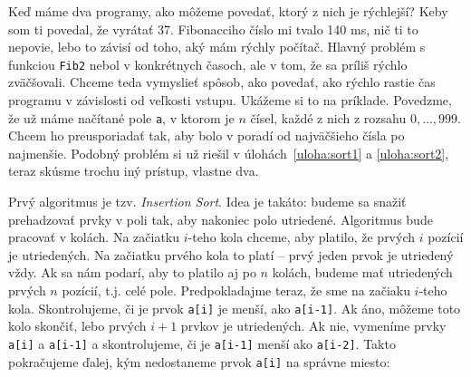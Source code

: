 \documentclass[10pt]{article}
\def\ods{\vspace*{10pt}}
\begin{document}
\ods
Keď máme dva programy, ako môžeme povedať, ktorý z nich je rýchlejší?
Keby som ti povedal, že vyrátať 37. Fibonacciho číslo mi tvalo 140 ms, nič ti to nepovie,
lebo to závisí od toho, aký mám rýchly počítač. Hlavný problém s funkciou {\tt Fib2} nebol 
v konkrétnych časoch, ale v tom, že sa príliš rýchlo zväčšovali. Chceme teda vymyslieť 
spôsob, ako povedať, ako rýchlo rastie čas programu v závislosti od veľkosti vstupu.
Ukážeme si to na príklade. Povedzme, že už máme načítané pole {\tt a},
v ktorom je $n$ čísel, každé
z nich z rozsahu $0,\ldots,999$. 
Chcem ho preusporiadať tak, aby bolo v poradí od najväčšieho čísla po najmenšie.
Podobný problém si už riešil v úlohách~\ref{uloha:sort1} a \ref{uloha:sort2}, 
teraz skúsme trochu iný prístup, vlastne dva.

\ods
Prvý algoritmus je tzv. {\em Insertion Sort}. Idea je takáto: budeme sa snažiť
prehadzovať prvky v poli tak, aby nakoniec polo utriedené. Algoritmus bude pracovať v
kolách. Na začiatku $i$-teho kola chceme, aby platilo, že prvých $i$ pozícií je
utriedených. Na začiatku prvého kola to platí -- prvý jeden prvok je utriedený vždy.
Ak sa nám podarí, aby to platilo aj po $n$ kolách, budeme mať utriedených
prvých $n$ pozícií, t.j. celé pole. Predpokladajme teraz, že sme na začiaku $i$-teho kola.
Skontrolujeme, či je prvok {\tt a[i]} je menší, ako {\tt a[i-1]}. 
Ak áno, môžeme toto kolo skončiť,
lebo prvých $i+1$ prvkov je utriedených. Ak nie, vymeníme prvky {\tt a[i]} a 
{\tt a[i-1]}
a skontrolujeme, či je {\tt a[i-1]} menší ako {\tt a[i-2]}. Takto pokračujeme ďalej, kým
nedostaneme prvok {\tt a[i]} na správne miesto:
\end{document}
